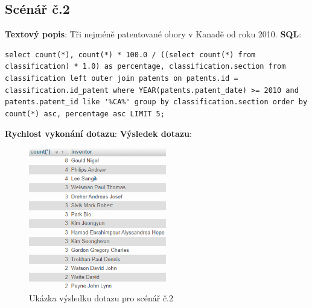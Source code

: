\subsection{Scénář č.2}
\textbf{Textový popis}: Tři nejméně patentované obory v Kanadě od roku 2010.
\newline
\textbf{SQL}: 
\begin{lstlisting}[label = {lst:elements_a}]
select count(*), count(*) * 100.0 / ((select count(*) from classification) * 1.0) as percentage, classification.section from classification left outer join patents on patents.id = classification.id_patent where YEAR(patents.patent_date) >= 2010 and patents.patent_id like '%CA%' group by classification.section order by count(*) asc, percentage asc LIMIT 5;
\end{lstlisting}
\textbf{Rychlost vykonání dotazu}: 
\newline
\textbf{Výsledek dotazu}:
\begin{figure}[H]
\centering
\includegraphics[width=6cm]{img/scenare/scenar_9}
\caption{Ukázka výsledku dotazu pro scénář č.2}
\label{fig:scenar2}
\end{figure}


